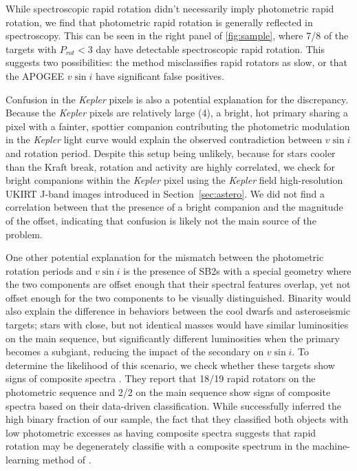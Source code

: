 \documentclass[manuscript]{aastex6}
\newcommand{\vsini}{\ensuremath{v \sin i}}
\newcommand{\Kepler}{\mbox{\textit{Kepler}}}
\begin{document}
While spectroscopic rapid rotation didn't necessarily imply photometric
rapid rotation, we find that photometric rapid rotation is generally
reflected in spectroscopy. This can be seen in the right panel of
\cref{fig:sample}, where 7/8 of the targets with \(P_{rot} < 3\) day
have detectable spectroscopic rapid rotation. This suggests two
possibilities: the \citet{McQuillan14} method misclassifies rapid
rotators as slow, or that the APOGEE \vsini{} have significant false
positives.

Confusion in the \Kepler{} pixels is also a potential explanation for the
discrepancy. Because the \Kepler{} pixels are relatively large (4\arcsec), a 
bright, hot primary sharing a pixel with a fainter, spottier companion 
contributing the photometric modulation in the
\Kepler{} light curve would explain the observed contradiction between
\vsini{} and rotation period. Despite this setup being unlikely, because for 
stars cooler than the Kraft break, rotation and activity are highly 
correlated, we check for bright companions
within the \Kepler{} pixel using the \Kepler{} field high-resolution UKIRT
J-band images introduced in Section~\ref{sec:astero}. We did not find a 
correlation between that the presence of a bright companion and the magnitude 
of the offset, indicating that confusion is likely not the main source of the 
problem.

One other potential explanation for the mismatch between the photometric
rotation periods and \vsini{} is the presence of SB2s with a special geometry
where the two components are offset enough that their spectral features
overlap, yet not offset enough for the two components to be visually
distinguished. Binarity would also explain the difference in behaviors
between the cool dwarfs and asteroseismic targets; stars with close, but
not identical masses would have similar luminosities on the main
sequence, but significantly different luminosities when the primary
becomes a subgiant, reducing the impact of the secondary on
\vsini{}. To determine the likelihood of this scenario, we check whether
these targets show signs of composite spectra \citep{ElBadry18}. They
report that 18/19 rapid rotators on the photometric sequence and 2/2 on the
main sequence show signs of composite spectra based on their
data-driven classification. While \citet{ElBadry18} successfully inferred the
high binary fraction of our sample, the fact that they classified both objects
with low photometric excesses as having composite spectra suggests that 
rapid rotation may be degenerately classifie with a composite spectrum
in the machine-learning method of \citet{ElBadry18}.
\end{document}
